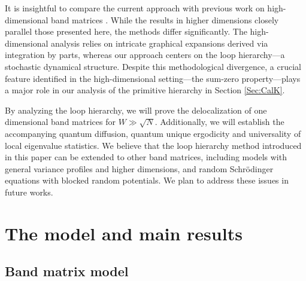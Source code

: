 \documentclass[10pt,reqno]{article}
\theoremstyle{plain} %
\theoremstyle{remark}
\numberwithin{equation}{section}
\begin{document}
It is insightful to compare the current approach with previous work on high-dimensional band matrices \cite{yang2021delocalization, Xu:2024aa}. While the results in higher dimensions closely parallel those presented here, the methods differ significantly. The high-dimensional analysis relies on intricate graphical expansions derived via integration by parts, whereas our approach centers on the loop hierarchy—a stochastic dynamical structure. Despite this methodological divergence, a crucial feature identified in the high-dimensional setting—the sum-zero property—plays a major  role in our analysis of the primitive hierarchy in Section \ref{Sec:CalK}.


By analyzing the loop hierarchy, we will prove the delocalization of one dimensional band matrices for  \( W \gg  \sqrt{N} \). Additionally, we will establish the accompanying quantum diffusion,  quantum unique ergodicity and universality of local eigenvalue statistics.  We believe that the loop hierarchy method introduced in this paper can be extended to other  band matrices, including models with general variance profiles and higher dimensions,  and   random Schrödinger equations with blocked random potentials. We plan to  address these issues in  future works.



\section{The model and main results}
 \subsection{Band matrix model}\label{subsec_setting}

 
 
\end{document}
